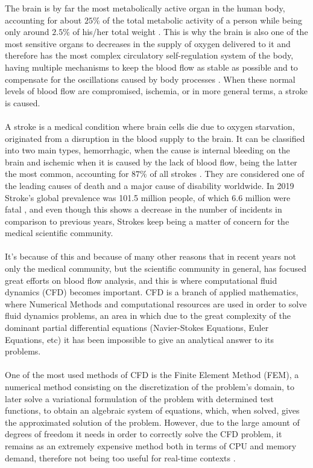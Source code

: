 \documentclass[12pt,letterpaper]{article}
\begin{document}
The brain is by far the most metabolically active organ in the human body, 
accounting for about $25\%$ of the total metabolic activity of a person
while being only around $2.5\%$ of his/her total weight \cite{Ischemia}.
This is why the brain is also one of the most sensitive organs to decreases 
in the supply of oxygen delivered to it and therefore has the most complex 
circulatory self-regulation system of the body,  having multiple mechanisms 
to keep the blood flow as stable as possible and to compensate for the 
oscillations caused by body processes \cite{AnatoFisio}. When these normal
levels of blood flow are compromised,  ischemia,  or in more general terms, 
a stroke is caused.\\~\\

A stroke is a medical condition where brain cells die due to oxygen starvation,
originated from a disruption in the blood supply to the brain. It can
be classified into two main types, hemorrhagic, when the cause is internal bleeding
on the brain and ischemic when it is caused by the lack of blood flow,  being the 
latter the most common,  accounting for $87\%$ of all strokes \cite{johns_hopkins_medicine}.
They are considered one of the leading causes of death and a major cause
of disability worldwide. In 2019 Stroke's global prevalence was 101.5 million 
people,  of which 6.6 million were fatal \cite{burden},  and even though this shows 
a decrease in the number of incidents in comparison to previous years,  Strokes keep being a
matter of concern for the medical scientific community.\\~\\

It’s because of this and because of many other reasons that in recent years 
not only the medical community,  but the scientific community in general,  
has focused great efforts on blood flow analysis,  and this is where computational 
fluid dynamics (CFD) becomes important. CFD is a branch of applied mathematics,  
where Numerical Methods and computational resources are used in order to solve 
fluid dynamics problems,  an area in which due to the great complexity of the 
dominant partial differential equations (Navier-Stokes Equations,  Euler Equations, 
etc) it has been impossible to give an analytical answer to its problems.\\~\\

One of the most used methods of CFD is the Finite Element Method (FEM), a numerical method
consisting on the discretization of the problem's domain, to later solve a variational 
formulation of the problem with determined test functions, to obtain an algebraic system of 
equations, which, when solved, gives the approximated solution of the problem. However, due 
to the large amount of degrees of freedom it needs in order to correctly solve the CFD 
problem, it remains as an extremely expensive method both in terms of CPU and memory 
demand, therefore not being too useful for real-time contexts \cite{hesthaven2018non}.\\~\\
\end{document}
